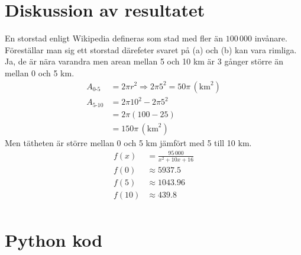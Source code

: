 \documentclass{article}
\begin{document}
\section*{Diskussion av resultatet}
En storstad enligt Wikipedia defineras som stad med fler än \( 100\,000 \)
invånare. Föreställar man sig ett storstad därefeter svaret på (a) och (b) kan
vara rimliga. Ja, de är nära varandra men arean mellan 5 och 10 km är 3 gånger
större än mellan 0 och 5 km. 
\begin{align*}
	A_{\text{0-5}} &= 2\pi r^2	\Rightarrow 2\pi 5^2 = 50\pi
\, \left( \si{\kilo\meter}^2 \right) \\
	A_{\text{5-10}} &= 2\pi 10^2 - 2\pi 5^2 \\
			&= 2\pi(100 - 25) \\
			&= 150\pi \, \left( \si{\kilo\meter}^2 \right)
\end{align*}
Men tätheten är större mellan 0 och 5 km jämfört
med 5 till 10 km.
\begin{align*}
	f(x) &= \frac{95\,000}{x^2+10x+16} \\
	f(0) &\approx 5937.5 \\
	f(5) &\approx 1043.96\\
	f(10) &\approx 439.8\\
\end{align*}

\newpage
\appendix
\section{Python kod}
\label{app:python_code}

\end{document}
